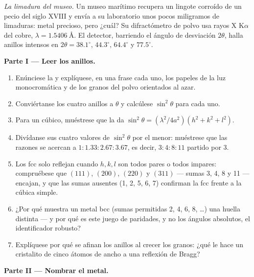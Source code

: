 \begin{problem}\label{pb:b3:crystalline-solids:1}
\emph{La limadura del museo.} Un museo marítimo recupera un lingote
corroído de un pecio del siglo XVIII y envía a su laboratorio
unos pocos miligramos de limaduras: metal precioso, pero ¿cuál? Su
difractómetro de polvo usa rayos X K$\alpha$ del cobre,
$\lambda = \qty{1.5406}{\angstrom}$. El detector, barriendo el
ángulo de desviación $2\theta$, halla anillos intensos en $2\theta =
38.1^\circ$, $44.3^\circ$, $64.4^\circ$ y $77.5^\circ$.

\medskip\noindent\textbf{Parte I --- Leer los anillos.}

\begin{enumerate}
  \item Enúnciese la  y explíquese, en una frase cada uno, los
        papeles de la luz monocromática y de los granos del polvo
        orientados al azar.
  \item Conviértanse los cuatro anillos a $\theta$ y calcúlese
        $\sin^2\theta$ para cada uno.
  \item Para un  cúbico, muéstrese que la  da
        $\sin^2\theta = (\lambda^2/4a^2)(h^2 + k^2 + l^2)$.
  \item Divídanse sus cuatro valores de $\sin^2\theta$ por el menor:
        muéstrese que las razones se acercan a $1 : 1.33 : 2.67 : 3.67$,
        es decir, $3 : 4 : 8 : 11$ partido por 3.
  \item Los  fcc solo reflejan cuando $h, k, l$ son todos pares o
        todos impares: compruébese que $(111)$, $(200)$, $(220)$ y $(311)$ ---
        sumas 3, 4, 8 y 11 --- encajan, y que las sumas ausentes
        (1, 2, 5, 6, 7) confirman la fcc frente a la cúbica simple.
  \item ¿Por qué muestra un metal bcc (sumas permitidas 2, 4, 6, 8, \dots)
        una huella distinta --- y por qué es este juego de paridades,
        y no los ángulos absolutos, el identificador robusto?
  \item Explíquese por qué se afinan los anillos al crecer los granos: ¿qué le hace un
        cristalito de cinco átomos de ancho a una reflexión de Bragg?
\end{enumerate}

\medskip\noindent\textbf{Parte II --- Nombrar el metal.}


\end{problem}
